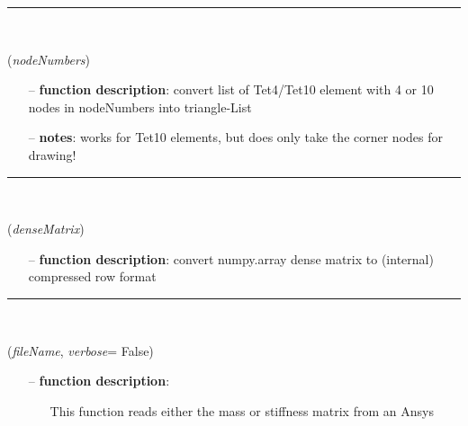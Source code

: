 \begin{itemize}[leftmargin=1.4cm]
\begin{itemize}[leftmargin=1.4cm]
\begin{itemize}[leftmargin=1.4cm]
\begin{itemize}[leftmargin=0.5cm]
\begin{itemize}[leftmargin=1.4cm]
\begin{itemize}[leftmargin=1.4cm]
\begin{itemize}[leftmargin=0.5cm]
%
\noindent\rule{8cm}{0.75pt}\vspace{1pt} \\ 
\begin{flushleft}
\label{sec:FEM:ConvertTetToTrigs}
({\it nodeNumbers})
\end{flushleft}
\setlength{\itemindent}{0.7cm}
\begin{itemize}[leftmargin=0.7cm]
\item[--]
{\bf function description}: convert list of Tet4/Tet10 element with 4 or 10 nodes in nodeNumbers into triangle-List
\item[--]
{\bf notes}: works for Tet10 elements, but does only take the corner nodes for drawing!
\vspace{12pt}\end{itemize}
%
\noindent\rule{8cm}{0.75pt}\vspace{1pt} \\ 
\begin{flushleft}
\label{sec:FEM:ConvertDenseToCompressedRowMatrix}
({\it denseMatrix})
\end{flushleft}
\setlength{\itemindent}{0.7cm}
\begin{itemize}[leftmargin=0.7cm]
\item[--]
{\bf function description}: convert numpy.array dense matrix to (internal) compressed row format
\vspace{12pt}\end{itemize}
%
\noindent\rule{8cm}{0.75pt}\vspace{1pt} \\ 
\begin{flushleft}
\label{sec:FEM:ReadMatrixFromAnsysMMF}
({\it fileName}, {\it verbose}= False)
\end{flushleft}
\setlength{\itemindent}{0.7cm}
\begin{itemize}[leftmargin=0.7cm]
\item[--]
{\bf function description}: \vspace{-6pt}
\begin{itemize}[leftmargin=1.2cm]
\setlength{\itemindent}{-0.7cm}
\item[]This function reads either the mass or stiffness matrix from an Ansys

\end{itemize}
\end{itemize}
\end{itemize}
\end{itemize}
\end{itemize}
\end{itemize}
\end{itemize}
\end{itemize}
\end{itemize}
